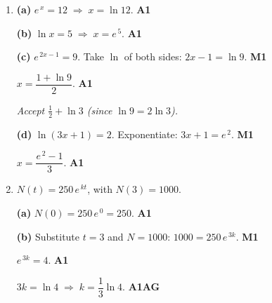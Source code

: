 \documentclass[12pt, twoside]{article}
\begin{document}
\begin{enumerate}[itemsep=0.3cm]
\medskip

\textbf{(b)} $e^{\,\ln 7} = 7$. \hfill \textbf{A1}

\medskip

\textbf{(c)} $\ln\!\left(e^{\,2x+1}\right) = 2x + 1$. \hfill \textbf{A1}

\medskip

\textbf{(d)} $e^{\,3\ln 2} = e^{\,\ln 2^3} = e^{\,\ln 8}$.
\hfill \textbf{M1}

$= 8$. \hfill \textbf{A1}

\emph{M1 may also be awarded for
$e^{\,3\ln 2} = \!\left(e^{\,\ln 2}\right)^{\!3} = 2^3$.}

\item[3.] [Maximum mark: 6]

\textbf{(a)} $e^{\,x} = 12 \;\Rightarrow\; x = \ln 12$. \hfill \textbf{A1}

\medskip

\textbf{(b)} $\ln x = 5 \;\Rightarrow\; x = e^{\,5}$. \hfill \textbf{A1}

\medskip

\textbf{(c)} $e^{\,2x-1} = 9$. \;Take $\ln$ of both sides:
$2x - 1 = \ln 9$. \hfill \textbf{M1}

$x = \dfrac{1 + \ln 9}{2}$. \hfill \textbf{A1}

\emph{Accept $\tfrac{1}{2} + \ln 3$ \;(since $\ln 9 = 2\ln 3$).}

\medskip

\textbf{(d)} $\ln(3x + 1) = 2$. \;Exponentiate: $3x + 1 = e^{\,2}$.
\hfill \textbf{M1}

$x = \dfrac{e^{\,2} - 1}{3}$. \hfill \textbf{A1}

\newpage

\item[4.] [Maximum mark: 13]

$N(t) = 250\, e^{\,kt}$, with $N(3) = 1000$.

\textbf{(a)} $N(0) = 250\, e^{\,0} = 250$. \hfill \textbf{A1}

\medskip

\textbf{(b)} Substitute $t = 3$ and $N = 1000$:
$1000 = 250\, e^{\,3k}$. \hfill \textbf{M1}

$e^{\,3k} = 4$. \hfill \textbf{A1}

$3k = \ln 4 \;\Rightarrow\; k = \dfrac{1}{3}\ln 4$. \hfill \textbf{A1\;AG}

\medskip


\end{enumerate}
\end{document}
